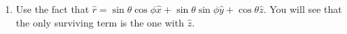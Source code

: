 \documentclass{article}
\begin{document}
\begin{enumerate}
\item Use the fact that $\hat{r} = \sin\theta\cos\phi\hat{x} + \sin\theta
\sin\phi\hat{y} + \cos\theta\hat{z}$. You will see that the only surviving 
term is the one with $\hat{z}$.
\end{enumerate}
\end{document}
